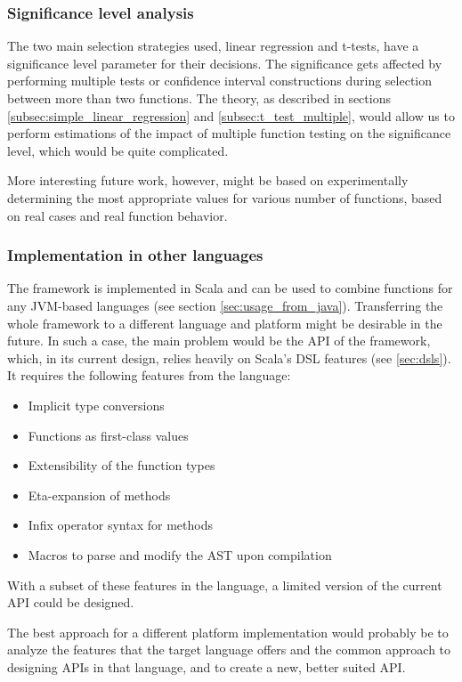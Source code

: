 \subsubsection{Significance level analysis}

The two main selection strategies used, linear regression and t-tests, have a significance level parameter for their decisions. The significance gets affected by performing multiple tests or confidence interval constructions during selection between more than two functions. The theory, as described in sections \ref{subsec:simple_linear_regression} and \ref{subsec:t_test_multiple}, would allow us to perform estimations of the impact of multiple function testing on the significance level, which would be quite complicated. 

More interesting future work, however, might be based on experimentally determining the most appropriate values for various number of functions, based on real cases and real function behavior.

\subsubsection{Implementation in other languages}

The framework is implemented in Scala and can be used to combine functions for any JVM-based languages (see section \ref{sec:usage_from_java}). Transferring the whole framework to a different language and platform might be desirable in the future. In such a case, the main problem would be the API of the framework, which, in its current design, relies heavily on Scala's DSL features (see \ref{sec:dsls}). It requires the following features from the language:

\begin{itemize}
	\item Implicit type conversions
	\item Functions as first-class values
	\item Extensibility of the function types
	\item Eta-expansion of methods
	\item Infix operator syntax for methods
	\item Macros to parse and modify the AST upon compilation
\end{itemize}

With a subset of these features in the language, a limited version of the current API could be designed. 

The best approach for a different platform implementation would probably be to analyze the features that the target language offers and the common approach to designing APIs in that language, and to create a new, better suited API.
